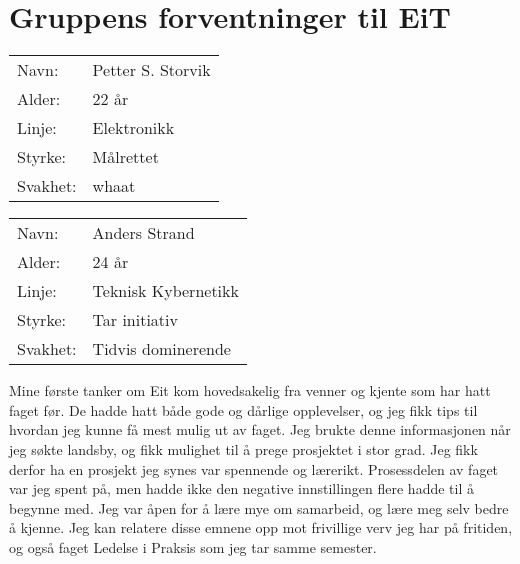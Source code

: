 \section{Gruppens forventninger til EiT}

\begin{table}[H]
    \begin{tabular}{l l}
        Navn: & Petter S. Storvik \\
        Alder: & 22 år \\ 
        Linje: & Elektronikk \\
        Styrke: & Målrettet \\
        Svakhet: & whaat 
    \end{tabular}
    
\end{table}

\lipsum[0-1]

\begin{table}[H]
\begin{tabular}{l l}
        Navn: & Anders Strand \\
        Alder: & 24 år \\ 
        Linje: & Teknisk Kybernetikk \\
        Styrke: & Tar initiativ \\
        Svakhet: & Tidvis dominerende
    \end{tabular}
\end{table}

Mine første tanker om Eit kom hovedsakelig fra venner og kjente som har hatt faget før.
De hadde hatt både gode og dårlige opplevelser, og jeg fikk tips til hvordan jeg kunne få mest mulig ut av faget. Jeg brukte denne informasjonen når jeg søkte landsby, og fikk mulighet til å prege prosjektet i stor grad. Jeg fikk derfor ha en prosjekt jeg synes var spennende og lærerikt.
Prosessdelen av faget var jeg spent på, men hadde ikke den negative innstillingen flere hadde til å begynne med. Jeg var åpen for å lære mye om samarbeid, og lære meg selv bedre å kjenne. Jeg kan relatere disse emnene opp mot frivillige verv jeg har på fritiden, og også faget Ledelse i Praksis som jeg tar samme semester.
